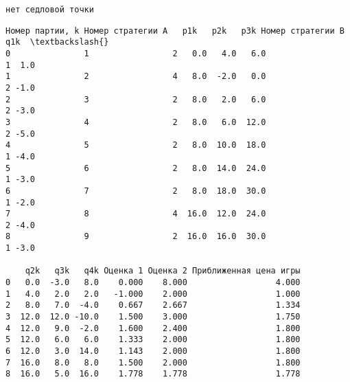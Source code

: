 \documentclass[11pt]{article}
\makeatletter
\newcommand{\boxspacing}{\kern\kvtcb@left@rule\kern\kvtcb@boxsep}
\newcommand{\prompt}[4]{
        {\ttfamily\llap{{\color{#2}[#3]:\hspace{3pt}#4}}\vspace{-\baselineskip}}
    }
\makeatother
\begin{document}
    \begin{Verbatim}[commandchars=\\\{\}]
нет седловой точки
    \end{Verbatim}

            \begin{tcolorbox}[breakable, size=fbox, boxrule=.5pt, pad at break*=1mm, opacityfill=0]
\prompt{Out}{outcolor}{26}{\boxspacing}
\begin{Verbatim}[commandchars=\\\{\}]
  Номер партии, k Номер стратегии A   p1k   p2k   p3k Номер стратегии B  q1k  \textbackslash{}
0               1                 2   0.0   4.0   6.0                 1  1.0
1               2                 4   8.0  -2.0   0.0                 2 -1.0
2               3                 2   8.0   2.0   6.0                 2 -3.0
3               4                 2   8.0   6.0  12.0                 2 -5.0
4               5                 2   8.0  10.0  18.0                 1 -4.0
5               6                 2   8.0  14.0  24.0                 1 -3.0
6               7                 2   8.0  18.0  30.0                 1 -2.0
7               8                 4  16.0  12.0  24.0                 2 -4.0
8               9                 2  16.0  16.0  30.0                 1 -3.0

    q2k   q3k   q4k Оценка 1 Оценка 2 Приближенная цена игры
0   0.0  -3.0   8.0    0.000    8.000                  4.000
1   4.0   2.0   2.0   -1.000    2.000                  1.000
2   8.0   7.0  -4.0    0.667    2.667                  1.334
3  12.0  12.0 -10.0    1.500    3.000                  1.750
4  12.0   9.0  -2.0    1.600    2.400                  1.800
5  12.0   6.0   6.0    1.333    2.000                  1.800
6  12.0   3.0  14.0    1.143    2.000                  1.800
7  16.0   8.0   8.0    1.500    2.000                  1.800
8  16.0   5.0  16.0    1.778    1.778                  1.778
\end{Verbatim}
\end{tcolorbox}
        
    \begin{center}
    \end{center}
    { \hspace*{\fill} \\}
    

    
    
    
\end{document}
